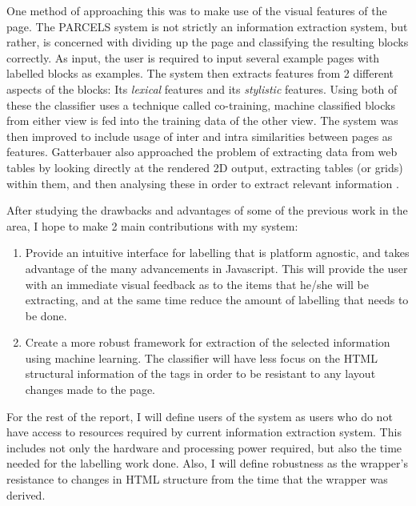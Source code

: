 One method of approaching this was to make use of the visual features of the page. The PARCELS
system is not strictly an information extraction system, but rather, is concerned with dividing
up the page and classifying the resulting blocks correctly. As input, the user is required to
input several example pages with labelled blocks as examples. The system then extracts features
from 2 different aspects of the blocks: Its \textit{lexical} features and its
\textit{stylistic} features. Using both of these the classifier uses a technique called
co-training, machine classified blocks from either view is fed into the training data of the
other view\cite{Lee2004}. The system was then improved to include usage of inter and intra
similarities between pages as features\cite{AikMiang2005}. Gatterbauer also approached the
problem of extracting data from web tables by looking directly at the rendered 2D output,
extracting tables (or grids) within them, and then analysing these in order to extract relevant
information \cite{Gatterbauer2007}.




After studying the drawbacks and advantages of some of the previous work in the area, I hope to
make 2 main contributions with my system:
\begin{enumerate}
	\item Provide an intuitive interface for labelling that is platform agnostic, and takes advantage of the many advancements in Javascript. This will provide the user with an immediate visual feedback as to the items that he/she will be extracting, and at the same time reduce the amount of labelling that needs to be done.
	\item Create a more robust framework for extraction of the selected information using machine learning. The classifier will have less focus on the HTML structural information of the tags in order to be resistant to any layout changes made to the page.
\end{enumerate}

For the rest of the report, I will define users of the system as users who do not have access 
to resources required by current information extraction system. This includes not only the 
hardware and processing power required, but also the time needed for the labelling work done.
Also, I will define robustness as the wrapper's resistance to changes in HTML structure from
the time that the wrapper was derived.






